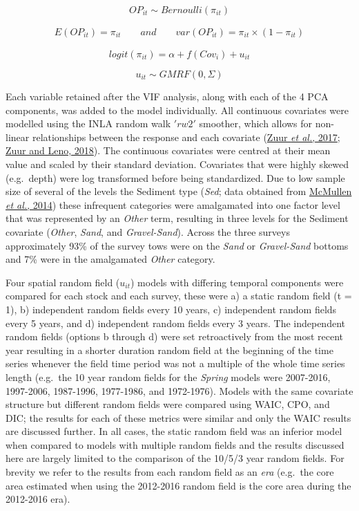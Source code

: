 \documentclass[
]{article}
\begin{document}
\[ OP_{it} \sim Bernoulli(\pi_{it}) \]

\begin{align}
E(OP_{it}) = \pi_{it} \qquad and \qquad var(OP_{it}) = \pi_{it} \times (1-\pi_{it})
\end{align}

\[ logit(\pi_{it}) = \alpha + f(Cov_{i}) + u_{it} \]

\[ u_{it} \sim GMRF(0,\Sigma) \]

Each variable retained after the VIF analysis, along with each of the 4 PCA components, was added to the model individually. All continuous covariates were modelled using the INLA random walk \('rw2'\) smoother, which allows for non-linear relationships between the response and each covariate (\protect\hyperlink{ref-zuurBeginnerGuideSpatial2017}{Zuur \emph{et al.}, 2017}; \protect\hyperlink{ref-zuurBeginnerGuideSpatial2018}{Zuur and Leno, 2018}). The continuous covariates were centred at their mean value and scaled by their standard deviation. Covariates that were highly skewed (e.g.~depth) were log transformed before being standardized. Due to low sample size of several of the levels the Sediment type (\emph{Sed}; data obtained from \protect\hyperlink{ref-mcmullen2014GISData2014}{McMullen \emph{et al.}, 2014}) these infrequent categories were amalgamated into one factor level that was represented by an \emph{Other} term, resulting in three levels for the Sediment covariate (\emph{Other}, \emph{Sand}, and \emph{Gravel-Sand}). Across the three surveys approximately 93\% of the survey tows were on the \emph{Sand} or \emph{Gravel-Sand} bottoms and 7\% were in the amalgamated \emph{Other} category.

Four spatial random field (\(u_{it}\)) models with differing temporal components were compared for each stock and each survey, these were a) a static random field (t = 1), b) independent random fields every 10 years, c) independent random fields every 5 years, and d) independent random fields every 3 years. The independent random fields (options b through d) were set retroactively from the most recent year resulting in a shorter duration random field at the beginning of the time series whenever the field time period was not a multiple of the whole time series length (e.g.~the 10 year random fields for the \emph{Spring} models were 2007-2016, 1997-2006, 1987-1996, 1977-1986, and 1972-1976). Models with the same covariate structure but different random fields were compared using WAIC, CPO, and DIC; the results for each of these metrics were similar and only the WAIC results are discussed further. In all cases, the static random field was an inferior model when compared to models with multiple random fields and the results discussed here are largely limited to the comparison of the 10/5/3 year random fields. For brevity we refer to the results from each random field as an \emph{era} (e.g.~the core area estimated when using the 2012-2016 random field is the core area during the 2012-2016 era).
\end{document}
